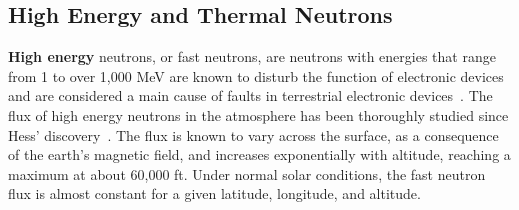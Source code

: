 

\subsection{High Energy and Thermal Neutrons}
\label{sec_environment}

\textbf{High energy} neutrons, or fast neutrons, are neutrons with energies that range from 1 to over 1,000 MeV are known to disturb the function of electronic devices and are considered a main cause of faults in terrestrial electronic devices~\cite{Baumann2005,ziegler2004ser}. %
The flux of high energy neutrons in the atmosphere has been thoroughly studied since Hess' discovery~\cite{Hess,Ziegler1996}. The flux is known to vary across the surface, as a consequence of the earth's magnetic field, and increases exponentially with altitude, reaching a maximum at about 60,000 ft. Under normal solar conditions, the fast neutron flux is almost constant for a given latitude, longitude, and altitude. 


